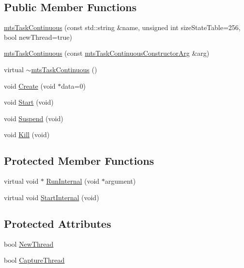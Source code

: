 \subsection*{Public Member Functions}
\begin{DoxyCompactItemize}
\item 
\hyperlink{classmts_task_continuous_aa4b574ad6b3400d74e0986658648c787}{mts\-Task\-Continuous} (const std\-::string \&name, unsigned int size\-State\-Table=256, bool new\-Thread=true)
\item 
\hyperlink{classmts_task_continuous_a71a509719307ae6318756ecb0c2af84b}{mts\-Task\-Continuous} (const \hyperlink{classmts_task_continuous_constructor_arg}{mts\-Task\-Continuous\-Constructor\-Arg} \&arg)
\item 
virtual \hyperlink{classmts_task_continuous_a654204c18f81e298a988e89a3a524d02}{$\sim$mts\-Task\-Continuous} ()
\item 
void \hyperlink{classmts_task_continuous_a28e79bc5f1a3eb9b7ef01910dd2b55e8}{Create} (void $\ast$data=0)
\item 
void \hyperlink{classmts_task_continuous_a935299c6e0bb33bb524fee95610a40ee}{Start} (void)
\item 
void \hyperlink{classmts_task_continuous_ac227f446b1316fa938016d3190652f0d}{Suspend} (void)
\item 
void \hyperlink{classmts_task_continuous_ad1f8145306e074fbea8baab3beef4c5b}{Kill} (void)
\end{DoxyCompactItemize}
\subsection*{Protected Member Functions}
\begin{DoxyCompactItemize}
\item 
virtual void $\ast$ \hyperlink{classmts_task_continuous_ae7335e46dbed0ab3e1e44b628c438319}{Run\-Internal} (void $\ast$argument)
\item 
virtual void \hyperlink{classmts_task_continuous_ac15a9fc5d7e15c27a3677171770069c0}{Start\-Internal} (void)
\end{DoxyCompactItemize}
\subsection*{Protected Attributes}
\begin{DoxyCompactItemize}
\item 
bool \hyperlink{classmts_task_continuous_a10a9569559a59e62d28ab29c6fc7636c}{New\-Thread}
\item 
bool \hyperlink{classmts_task_continuous_ae820327812640e231d44a4b2ad6b148e}{Capture\-Thread}
\end{DoxyCompactItemize}
